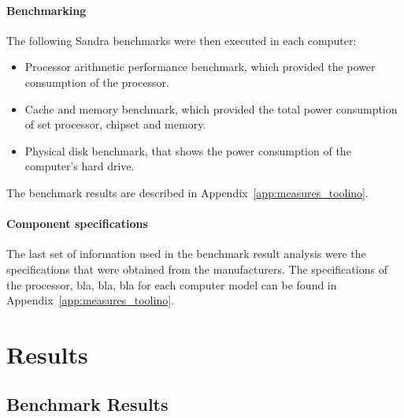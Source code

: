         \paragraph*{Benchmarking}
            The following Sandra benchmarks were then executed in each computer:
            \begin{itemize}
                \item Processor arithmetic performance benchmark, which provided the power consumption of the processor.
                \item Cache and memory benchmark, which provided the total power consumption of set processor, chipset and memory.
                \item Physical disk benchmark, that shows the power consumption of the computer's hard drive.
            \end{itemize}
            
            The benchmark results are described in Appendix~\ref{app:measures_toolino}.
            
        \paragraph*{Component specifications}
            The last set of information used in the benchmark result analysis were the specifications that were obtained from the manufacturers.
            The specifications of the processor, bla, bla, bla for each computer model can be found in Appendix~\ref{app:measures_toolino}.
                        
            
\section{Results} \label{sec4:results}
\subsection{Benchmark Results} \label{sec4:benchmark_results}

